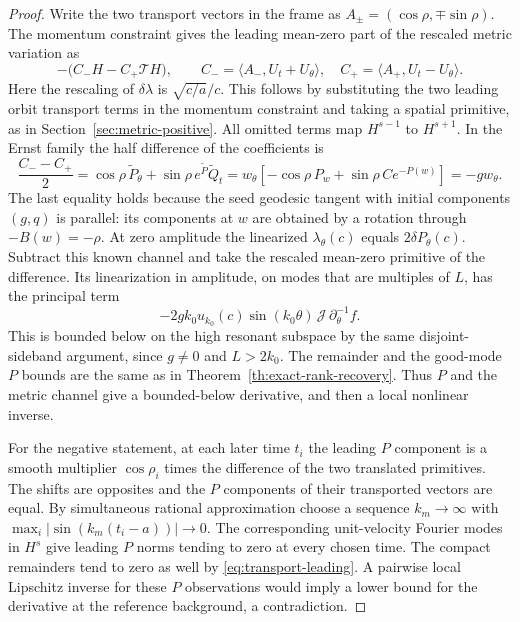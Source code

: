 \begin{proof}
Write the two transport vectors in the frame as
$A_\pm=(\cos\rho,\mp\sin\rho)$.
The momentum constraint gives the leading
mean-zero part of the rescaled metric variation as
\[
 -\big(C_-H-C_+\mathcal T H\big),\qquad
 C_-=\langle A_-,U_t+U_\theta\rangle,\quad
 C_+=\langle A_+,U_t-U_\theta\rangle .
\]
Here the rescaling of $\delta\lambda$ is $\sqrt{c/a}/c$.
This follows by substituting the two leading orbit
transport terms in the momentum constraint and taking
a spatial primitive, as in Section~\ref{sec:metric-positive}.
All omitted terms map $H^{s-1}$ to $H^{s+1}$.
In the Ernst family the half difference of the
coefficients is
\[
 \frac{C_--C_+}{2}
 =\cos\rho\,\widetilde P_\theta
    +\sin\rho\,e^{\widetilde P}\widetilde Q_t
 =w_\theta[-\cos\rho\,P_w+\sin\rho\,C e^{-P(w)}]
 =-g w_\theta .
\]
The last equality holds because the seed geodesic
tangent with initial components $(g,q)$ is parallel:
its components at $w$ are obtained by a rotation
through $-B(w)=-\rho$.
At zero amplitude the linearized
$\lambda_\theta(c)$ equals $2\delta P_\theta(c)$.
Subtract this known channel and take the rescaled
mean-zero primitive of the difference.
Its linearization in amplitude, on modes that
are multiples of $L$, has the principal term
\[
 -2g k_0u_{k_0}(c)\sin(k_0\theta)\,
               \mathcal J\,\partial_\theta^{-1}f .
\]
This is bounded below on the high resonant
subspace by the same disjoint-sideband argument,
since $g\ne0$ and $L>2k_0$.
The remainder and the good-mode $P$ bounds are
the same as in Theorem~\ref{th:exact-rank-recovery}.
Thus $P$ and the metric channel give a bounded-below
derivative, and then a local nonlinear inverse.

For the negative statement, at each later time $t_i$
the leading $P$ component is a smooth multiplier
$\cos\rho_i$ times the difference of the two translated
primitives. The shifts are opposites and the $P$
components of their transported vectors are equal.
By simultaneous rational approximation choose a
sequence $k_m\to\infty$ with
$\max_i|\sin(k_m(t_i-a))|\to0$.
The corresponding unit-velocity Fourier modes in $H^s$
give leading $P$ norms tending to zero at every
chosen time. The compact remainders tend to zero
as well by \eqref{eq:transport-leading}.
A pairwise local Lipschitz inverse for these $P$
observations would imply a lower bound for the
derivative at the reference background, a
contradiction.
\end{proof}
